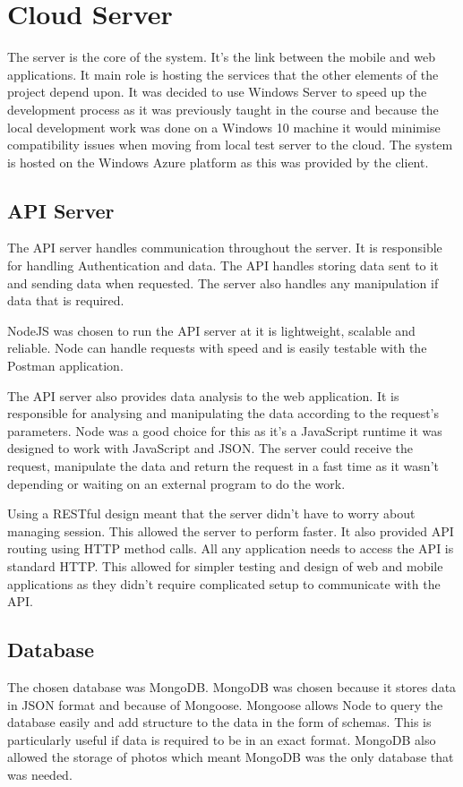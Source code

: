 \section{Cloud Server}
The server is the core of the system. It’s the link between the mobile and web applications. It main role is hosting the services that the other elements of the project depend upon. 
It was decided to use Windows Server to speed up the development process as it was previously taught in the course and because the local development work was done on a Windows 10 machine it would minimise compatibility issues when moving from local test server to the cloud. 
The system is hosted on the Windows Azure platform as this was provided by the client.

\subsection{API Server}
The API server handles communication throughout the server. It is responsible for handling Authentication and data. The API handles storing data sent to it and sending data when requested. The server also handles any manipulation if data that is required.

NodeJS was chosen to run the API server at it is lightweight, scalable and reliable. Node can handle requests with speed and is easily testable with the Postman application.

The API server also provides data analysis to the web application. It is responsible for analysing and manipulating the data according to the request’s parameters. Node was a good choice for this as it’s a JavaScript runtime it was designed to work with JavaScript and JSON. The server could receive the request, manipulate the data and return the request in a fast time as it wasn't depending or waiting on an external program to do the work.

Using a RESTful design meant that the server didn't have to worry about managing session. This allowed the server to perform faster. It also provided API routing using HTTP method calls. All any application needs to access the API is standard HTTP. This allowed for simpler testing and design of web and mobile applications as they didn't require complicated setup to communicate with the API.

\subsection{Database}
The chosen database was MongoDB. MongoDB was chosen because it stores data in JSON format and because of Mongoose. Mongoose allows Node to query the database easily and add structure to the data in the form of schemas. This is particularly useful if data is required to be in an exact format. MongoDB also allowed the storage of photos which meant MongoDB was the only database that was needed.

